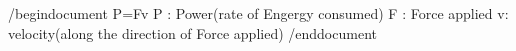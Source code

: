 /begindocument
P=Fv 
P : Power(rate of Engergy consumed)
F : Force applied
v: velocity(along the direction of Force applied)
/enddocument
